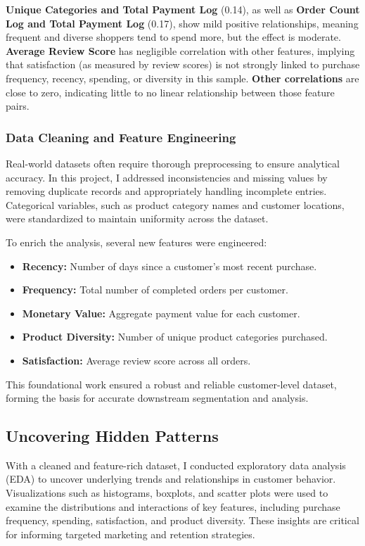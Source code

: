 \documentclass[a4paper]{article}
\begin{document}
\begin{multicols}{2}
\textbf{Unique Categories and Total Payment Log} (0.14), as well as \textbf{Order Count Log and Total Payment Log} (0.17), show mild positive relationships, meaning frequent and diverse shoppers tend to spend more, but the effect is moderate.
\textbf{Average Review Score} has negligible correlation with other features, implying that satisfaction (as measured by review scores) is not strongly linked to purchase frequency, recency, spending, or diversity in this sample.
\textbf{Other correlations} are close to zero, indicating little to no linear relationship between those feature pairs.




\subsubsection{Data Cleaning and Feature Engineering}
Real-world datasets often require thorough preprocessing to ensure analytical accuracy. In this project, I addressed inconsistencies and missing values by removing duplicate records and appropriately handling incomplete entries. Categorical variables, such as product category names and customer locations, were standardized to maintain uniformity across the dataset.

To enrich the analysis, several new features were engineered:
\begin{itemize}
    \item \textbf{Recency:} Number of days since a customer's most recent purchase.
    \item \textbf{Frequency:} Total number of completed orders per customer.
    \item \textbf{Monetary Value:} Aggregate payment value for each customer.
    \item \textbf{Product Diversity:} Number of unique product categories purchased.
    \item \textbf{Satisfaction:} Average review score across all orders.
\end{itemize}
This foundational work ensured a robust and reliable customer-level dataset, forming the basis for accurate downstream segmentation and analysis.

\subsection{Uncovering Hidden Patterns}
With a cleaned and feature-rich dataset, I conducted exploratory data analysis (EDA) to uncover underlying trends and relationships in customer behavior. Visualizations such as histograms, boxplots, and scatter plots were used to examine the distributions and interactions of key features, including purchase frequency, spending, satisfaction, and product diversity. These insights are critical for informing targeted marketing and retention strategies.


\end{multicols}
\end{document}
